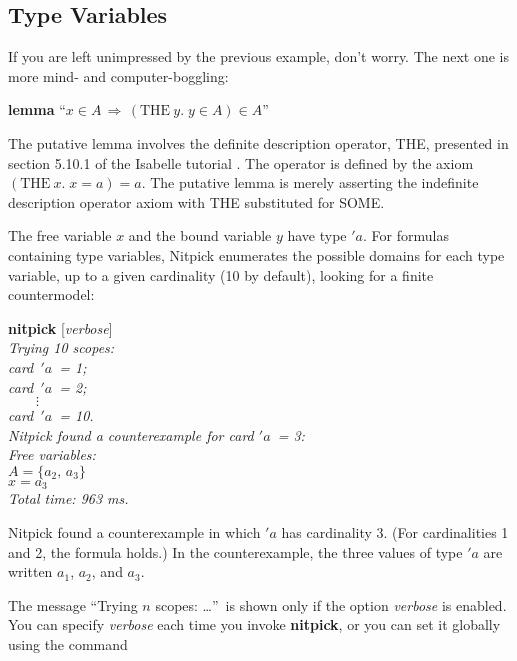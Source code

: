 \documentclass[a4paper,12pt]{article}
\renewcommand\_{\hbox{\textunderscore\kern-.05ex}}
\begin{document}
\subsection{Type Variables}
\label{type-variables}

If you are left unimpressed by the previous example, don't worry. The next
one is more mind- and computer-boggling:

\prew
\textbf{lemma} ``$x \in A\,\Longrightarrow\, (\textrm{THE}~y.\;y \in A) \in A$''
\postw
\pagebreak[2] %

The putative lemma involves the definite description operator, {THE}, presented
in section 5.10.1 of the Isabelle tutorial \cite{isa-tutorial}. The
operator is defined by the axiom $(\textrm{THE}~x.\; x = a) = a$. The putative
lemma is merely asserting the indefinite description operator axiom with {THE}
substituted for {SOME}.

The free variable $x$ and the bound variable $y$ have type $'a$. For formulas
containing type variables, Nitpick enumerates the possible domains for each type
variable, up to a given cardinality (10 by default), looking for a finite
countermodel:

\prew
\textbf{nitpick} [\textit{verbose}] \\[2\smallskipamount]
\slshape
Trying 10 scopes: \nopagebreak \\
\hbox{}\qquad \textit{card}~$'a$~= 1; \\
\hbox{}\qquad \textit{card}~$'a$~= 2; \\
\hbox{}\qquad $\qquad\vdots$ \\[.5\smallskipamount]
\hbox{}\qquad \textit{card}~$'a$~= 10. \\[2\smallskipamount]
Nitpick found a counterexample for \textit{card} $'a$~= 3: \\[2\smallskipamount]
\hbox{}\qquad Free variables: \nopagebreak \\
\hbox{}\qquad\qquad $A = \{a_2,\, a_3\}$ \\
\hbox{}\qquad\qquad $x = a_3$ \\[2\smallskipamount]
Total time: 963 ms.
\postw

Nitpick found a counterexample in which $'a$ has cardinality 3. (For
cardinalities 1 and 2, the formula holds.) In the counterexample, the three
values of type $'a$ are written $a_1$, $a_2$, and $a_3$.

The message ``Trying $n$ scopes: {\ldots}''\ is shown only if the option
\textit{verbose} is enabled. You can specify \textit{verbose} each time you
invoke \textbf{nitpick}, or you can set it globally using the command
\end{document}
